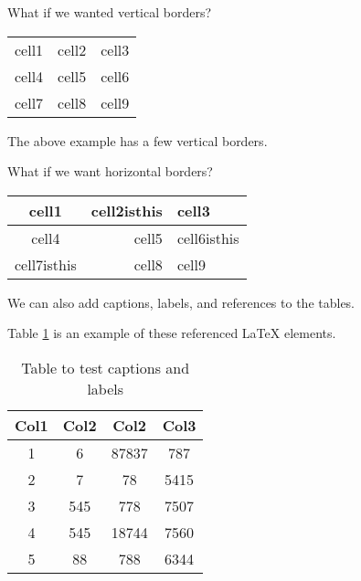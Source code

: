 \documentclass{report}
\begin{document}
What if we wanted vertical borders?

\begin{center}

\begin{tabular}{ |c|||r l| }

cell1 & cell2 & cell3 \\
cell4 & cell5 & cell6 \\
cell7 & cell8 & cell9

\end{tabular}

\end{center}

The above example has a few vertical borders.

What if we want horizontal borders?

\begin{center}

\begin{tabular}{c r l}

cell1 & cell2isthis & cell3 \\
\hline
cell4 & cell5 & cell6isthis \\
cell7isthis & cell8 & cell9 \\
\hline
\hline

\end{tabular}

\end{center}

We can also add captions, labels, and references to the tables. 

Table \ref{table:data} is an example of these referenced \LaTeX{} elements.
 
\begin{table}[h!]

\centering

\begin{tabular}{||c c c c||} 

 \hline
 Col1 & Col2 & Col2 & Col3 \\ 
 \hline\hline
 1 & 6 & 87837 & 787 \\ 
 2 & 7 & 78 & 5415 \\
 3 & 545 & 778 & 7507 \\
 4 & 545 & 18744 & 7560 \\
 5 & 88 & 788 & 6344 \\
 \hline
 
\end{tabular}

\caption{Table to test captions and labels}

\label{table:data}

\end{table}
\end{document}
